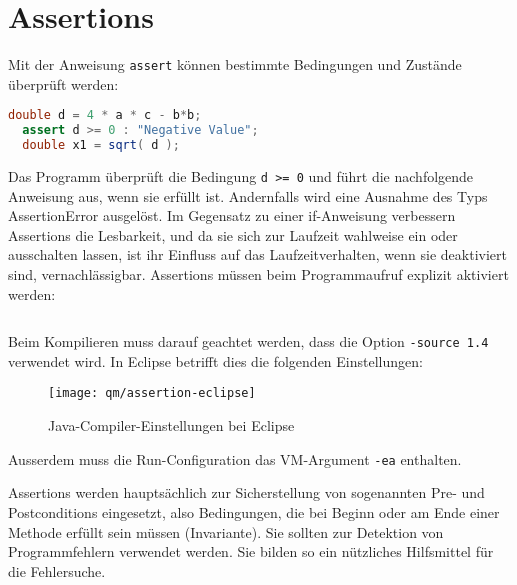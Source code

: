 \section{Assertions}
Mit der Anweisung \verb+assert+ können
bestimmte Bedingungen und Zustände überprüft werden:
\begin{lstlisting}[language=java, morekeywords={assert}]
  double d = 4 * a * c - b*b;
  assert d >= 0 : "Negative Value";
  double x1 = sqrt( d );
\end{lstlisting}
Das Programm überprüft die Bedingung \verb+d >= 0+ und führt die nachfolgende
Anweisung aus, wenn sie erfüllt ist. Andernfalls wird eine Ausnahme des Typs
AssertionError ausgelöst. Im Gegensatz zu einer if-Anweisung verbessern
Assertions  die Lesbarkeit, und da sie sich zur Laufzeit wahlweise ein
oder ausschalten lassen, ist ihr Einfluss auf das
 Laufzeitverhalten, wenn sie deaktiviert sind, vernachlässigbar.
\ifslides
\newpage
\fi
Assertions müssen beim Programmaufruf explizit aktiviert werden:
\begin{lstlisting}[language=csh]
% java -ea AssertionTest
\end{lstlisting}
Beim Kompilieren muss darauf geachtet werden, dass die Option
\verb+-source 1.4+ verwendet wird. In Eclipse betrifft dies
die folgenden Einstellungen:

\begin{figure}[H]
\centering
\texttt{[image: qm/assertion-eclipse]}
\caption{Java-Compiler-Einstellungen bei Eclipse}
\end{figure}
Ausserdem muss die Run-Configuration das VM-Argument \verb+-ea+ enthalten.

Assertions werden hauptsächlich zur Sicherstellung von sogenannten Pre- und
Postconditions eingesetzt, also Bedingungen, die bei Beginn oder am Ende einer
Methode erfüllt sein müssen (Invariante). Sie sollten zur Detektion von
Programmfehlern verwendet werden. Sie bilden so ein nützliches Hilfsmittel für
die Fehlersuche.
%
\newslide
